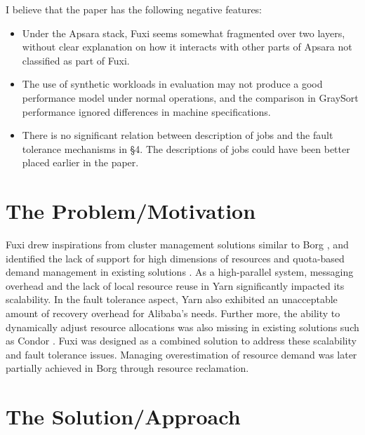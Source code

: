 \documentclass[11pt]{article}
\begin{document}
I believe that the paper has the following negative features:
\begin{itemize}
	\item Under the Apsara stack, Fuxi seems somewhat fragmented over two layers, without clear explanation on how it interacts with other parts of Apsara not classified as part of Fuxi.
	\item The use of synthetic workloads in evaluation may not produce a good performance model under normal operations, and the comparison in GraySort performance ignored differences in machine specifications.
	\item There is no significant relation between description of jobs and the fault tolerance mechanisms in \S4. The descriptions of jobs could have been better placed earlier in the paper.
\end{itemize}

\section*{The Problem/Motivation}

Fuxi drew inspirations from cluster management solutions similar to Borg \cite{verma2015large}, and identified the lack of support for high dimensions of resources and quota-based demand management in existing solutions \cite{vavilapalli2013apache} \cite{hindman2011mesos}. As a high-parallel system, messaging overhead and the lack of local resource reuse in Yarn significantly impacted its scalability. In the fault tolerance aspect, Yarn also exhibited an unacceptable amount of recovery overhead for Alibaba's needs. Further more, the ability to dynamically adjust resource allocations was also missing in existing solutions such as Condor \cite{thain2005distributed}. Fuxi was designed as a combined solution to address these scalability and fault tolerance issues. Managing overestimation of resource demand was later partially achieved in Borg \cite{verma2015large} through resource reclamation.

\section*{The Solution/Approach}
\end{document}
